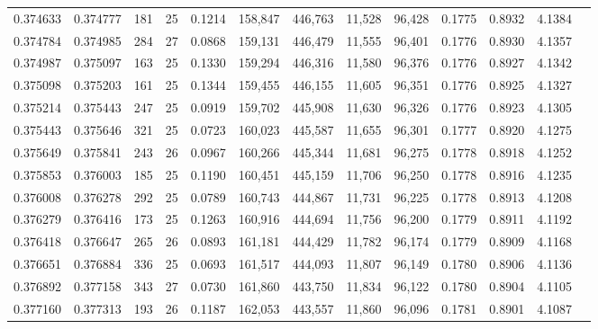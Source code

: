 \begin{tabular}{rrrrrrrrrrrrr}
0.374633 & 0.374777 & 181 &  25 &                                     0.1214 & 158,847 & 446,763 &  11,528 &  96,428 & 0.1775 & 0.8932 & 4.1384 \\
0.374784 & 0.374985 & 284 &  27 &                                     0.0868 & 159,131 & 446,479 &  11,555 &  96,401 & 0.1776 & 0.8930 & 4.1357 \\
0.374987 & 0.375097 & 163 &  25 &                                     0.1330 & 159,294 & 446,316 &  11,580 &  96,376 & 0.1776 & 0.8927 & 4.1342 \\
0.375098 & 0.375203 & 161 &  25 &                                     0.1344 & 159,455 & 446,155 &  11,605 &  96,351 & 0.1776 & 0.8925 & 4.1327 \\
0.375214 & 0.375443 & 247 &  25 &                                     0.0919 & 159,702 & 445,908 &  11,630 &  96,326 & 0.1776 & 0.8923 & 4.1305 \\
0.375443 & 0.375646 & 321 &  25 &                                     0.0723 & 160,023 & 445,587 &  11,655 &  96,301 & 0.1777 & 0.8920 & 4.1275 \\
0.375649 & 0.375841 & 243 &  26 &                                     0.0967 & 160,266 & 445,344 &  11,681 &  96,275 & 0.1778 & 0.8918 & 4.1252 \\
0.375853 & 0.376003 & 185 &  25 &                                     0.1190 & 160,451 & 445,159 &  11,706 &  96,250 & 0.1778 & 0.8916 & 4.1235 \\
0.376008 & 0.376278 & 292 &  25 &                                     0.0789 & 160,743 & 444,867 &  11,731 &  96,225 & 0.1778 & 0.8913 & 4.1208 \\
0.376279 & 0.376416 & 173 &  25 &                                     0.1263 & 160,916 & 444,694 &  11,756 &  96,200 & 0.1779 & 0.8911 & 4.1192 \\
0.376418 & 0.376647 & 265 &  26 &                                     0.0893 & 161,181 & 444,429 &  11,782 &  96,174 & 0.1779 & 0.8909 & 4.1168 \\
0.376651 & 0.376884 & 336 &  25 &                                     0.0693 & 161,517 & 444,093 &  11,807 &  96,149 & 0.1780 & 0.8906 & 4.1136 \\
0.376892 & 0.377158 & 343 &  27 &                                     0.0730 & 161,860 & 443,750 &  11,834 &  96,122 & 0.1780 & 0.8904 & 4.1105 \\
0.377160 & 0.377313 & 193 &  26 &                                     0.1187 & 162,053 & 443,557 &  11,860 &  96,096 & 0.1781 & 0.8901 & 4.1087 \\

\end{tabular}
